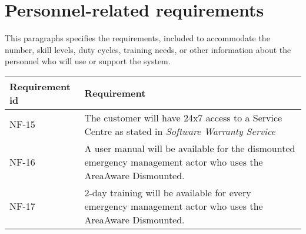 \section{Personnel-related requirements}
This paragraphs specifies the requirements, included to accommodate the number, skill levels, duty cycles, training needs, or other information about the personnel who will use or support the system.


\begin{longtable}{| p{3.2cm} |  p{10cm} | }
	\hline
	\textbf{Requirement id} &  \textbf{Requirement } \\
	\hline
	NF-15 & The customer will have 24x7 access to a Service Centre as stated in \emph{Software Warranty Service}  \\
	\hline
	NF-16 & A user manual will be available for the dismounted emergency management actor who uses the AreaAware Dismounted. \\
	\hline
	NF-17 & 2-day training will be available for every emergency management actor who uses the AreaAware Dismounted. \\
	\hline
\end{longtable}



